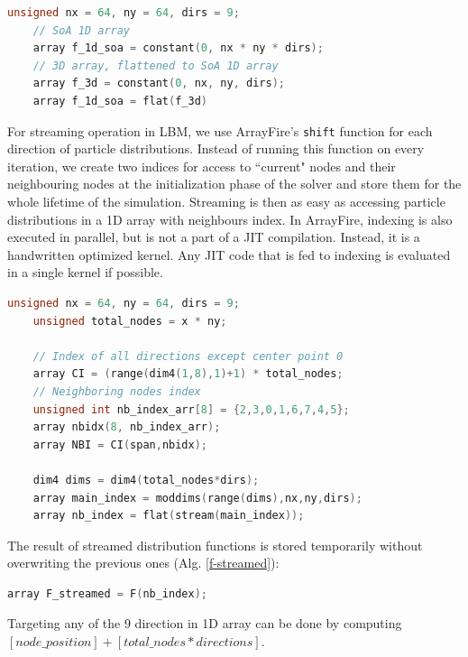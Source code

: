 \begin{lstlisting}[language=Cpp, caption=Creating SoA structure representation of D2Q9 lattice with ArrayFire in C++.]
	unsigned nx = 64, ny = 64, dirs = 9;
	// SoA 1D array
	array f_1d_soa = constant(0, nx * ny * dirs);
	// 3D array, flattened to SoA 1D array
	array f_3d = constant(0, nx, ny, dirs);
	array f_1d_soa = flat(f_3d)
\end{lstlisting}

For streaming operation in LBM, we use ArrayFire's \texttt{shift} function for each direction of particle distributions. Instead of running this function on every iteration, we create two indices for access to ``current" nodes and their neighbouring nodes at the initialization phase of the solver and store them for the whole lifetime of the simulation. Streaming is then as easy as accessing particle distributions in a 1D array with neighbours index. In ArrayFire, indexing is also executed in parallel, but is not a part of a JIT compilation. Instead, it is a handwritten optimized kernel. Any JIT code that is fed to indexing is evaluated in a single kernel if possible.

\begin{lstlisting}[language=Cpp, caption=Creating ``current" (or main) index and neighboring index.]
	unsigned nx = 64, ny = 64, dirs = 9;
	unsigned total_nodes = x * ny;
	
	// Index of all directions except center point 0
	array CI = (range(dim4(1,8),1)+1) * total_nodes;
	// Neighboring nodes index
	unsigned int nb_index_arr[8] = {2,3,0,1,6,7,4,5};
	array nbidx(8, nb_index_arr);
	array NBI = CI(span,nbidx);
	
	dim4 dims = dim4(total_nodes*dirs);
	array main_index = moddims(range(dims),nx,ny,dirs);
	array nb_index = flat(stream(main_index));
\end{lstlisting}

The result of streamed distribution functions is stored temporarily without overwriting the previous ones (Alg. \ref{f-streamed}):

\begin{lstlisting}[language=Cpp, caption=Streaming step., label=f-streamed]
	array F_streamed = F(nb_index);
\end{lstlisting}

Targeting any of the 9 direction in 1D array can be done by computing $[node\_position] + [total\_nodes * directions]$. 

